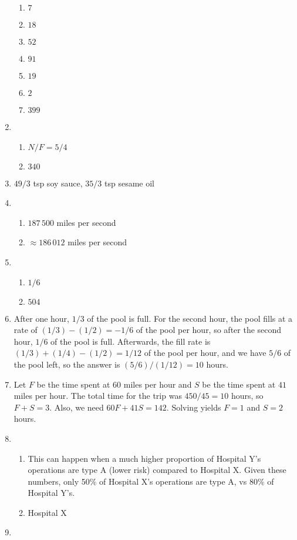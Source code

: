 \documentclass{article}
\begin{document}
\begin{multicols}{2}
\begin{enumerate}
\begin{enumerate}
\item $7$
\item $18$
\item $52$
\item $91$
\item $19$
\item $2$
\item $399$
\end{enumerate}
\item \begin{enumerate}
\item $N/F = 5/4$
\item $340$
\end{enumerate}
\item $49/3$ tsp soy sauce, $35/3$ tsp sesame oil
\item \begin{enumerate}
\item $187\,500$ miles per second
\item $\approx 186\,012$ miles per second
\end{enumerate}
\item \begin{enumerate}
\item $1/6$
\item $504$
\end{enumerate}
\item After one hour, $1/3$ of the pool is full. For the second hour, the pool fills at a rate of $(1/3) - (1/2) = -1/6$ of the pool per hour, so after the second hour, $1/6$ of the pool is full. Afterwards, the fill rate is $(1/3) + (1/4) - (1/2) = 1/12$ of the pool per hour, and we have $5/6$ of the pool left, so the answer is $(5/6) / (1/12) = \boxed{10}$ hours.
\item Let $F$ be the time spent at $60$ miles per hour and $S$ be the time spent at $41$ miles per hour. The total time for the trip was $450 / 45 = 10$ hours, so $F + S = 3$. Also, we need $60F + 41S = 142$. Solving yields $F = 1$ and $S = \boxed{2}$ hours.
\item \begin{enumerate}
\item This can happen when a much higher proportion of Hospital Y's operations are type A (lower risk) compared to Hospital X. Given these numbers, only 50\% of Hospital X's operations are type A, vs 80\% of Hospital Y's.
\item Hospital X
\end{enumerate}
\item \begin{enumerate}

\end{enumerate}
\end{enumerate}
\end{multicols}
\end{document}
